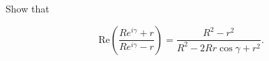 Show that

$$
\text{Re} \left( \frac{Re^{i \gamma} + r}{Re^{i \gamma} - r} \right) = \frac{R^2 - r^2}{R^2 - 2 R r \cos{\gamma} + r^2}.
$$
